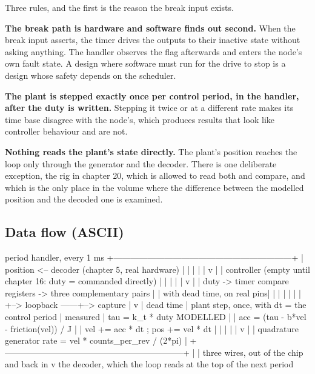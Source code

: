 Three rules, and the first is the reason the break input exists.

\textbf{The break path is hardware and software finds out second.} When the
break input asserts, the timer drives the outputs to their inactive state
without asking anything. The handler observes the flag afterwards and enters the
node's own fault state. A design where software must run for the drive to stop
is a design whose safety depends on the scheduler.

\textbf{The plant is stepped exactly once per control period, in the handler,
after the duty is written.} Stepping it twice or at a different rate makes its
time base disagree with the node's, which produces results that look like
controller behaviour and are not.

\textbf{Nothing reads the plant's state directly.} The plant's position reaches
the loop only through the generator and the decoder. There is one deliberate
exception, the rig in chapter 20, which is allowed to read both and compare, and
which is the only place in the volume where the difference between the modelled
position and the decoded one is examined.

\subsection*{Data flow (ASCII)}

\begin{asciiart}
  period handler, every 1 ms
  +---------------------------------------------------------------+
  | position  <-- decoder (chapter 5, real hardware)               |
  |    |                                                            |
  |    v                                                            |
  | controller  (empty until chapter 16: duty = commanded directly) |
  |    |                                                            |
  |    v                                                            |
  | duty -> timer compare registers -> three complementary pairs    |
  |                                     with dead time, on real pins|
  |    |                                        |                   |
  |    |                                        +--> loopback ------+--> capture
  |    v                                                            |    dead time
  | plant step, once, with dt = the control period                  |    measured
  |    tau  = k_t * duty          MODELLED                          |
  |    acc  = (tau - b*vel - friction(vel)) / J                     |
  |    vel += acc * dt ;  pos += vel * dt                           |
  |    |                                                            |
  |    v                                                            |
  | quadrature generator rate = vel * counts_per_rev / (2*pi)       |
  +---------------------------------------------------------------+
        |
        | three wires, out of the chip and back in
        v
   the decoder, which the loop reads at the top of the next period
\end{asciiart}

